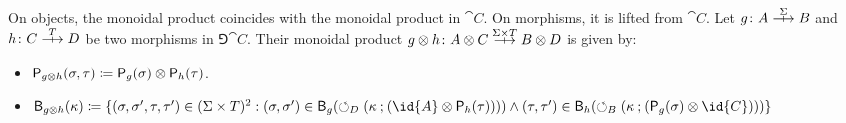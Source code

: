 On objects, the monoidal product coincides with the monoidal product in \(\cat{C}\).
On morphisms, it is lifted from \(\cat{C}\).
Let \(g \colon A \gamearrow{\Sigma} B\) and \(h \colon C \gamearrow{T} D\) be two morphisms in \(\Game{\cat{C}}\).
Their monoidal product \(g \tensor h \colon A \tensor C \gamearrow{\Sigma \times T} B \tensor D\) is given by:
\begin{itemize}
  \item \(\mathsf{P}_{g \otimes h} (\sigma,\tau) \coloneqq \mathsf{P}_{g}(\sigma) \otimes \mathsf{P}_{h}(\tau)\).
  \item \(\best{g \tensor h} (\kappa) \defn \{(\sigma, \sigma', \tau, \tau') \in (\Sigma \times T)^{2} : (\sigma, \sigma') \in \best{g}(\fbk[D](\kappa \dcomp (\id{A} \tensor \play{h}(\tau)))) \land (\tau, \tau') \in \best{h}(\fbk[B](\kappa \dcomp (\play{g}(\sigma) \tensor \id{C})))\}\)
\end{itemize}

